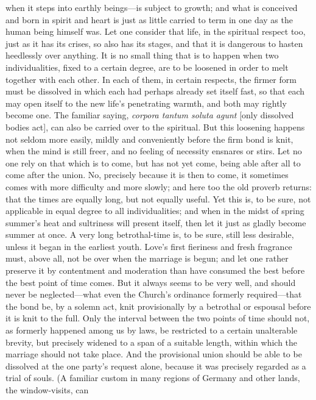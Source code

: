 \documentclass[12pt,a4paper]{book}
\begin{document}
when it steps into earthly beings---is subject to growth; and what is
conceived and born in spirit and heart is just as little carried to term in
one day as the human being himself was. Let one consider that life, in the
spiritual respect too, just as it has its crises, so also has its stages,
and that it is dangerous to hasten heedlessly over anything. It is no small
thing that is to happen when two individualities, fixed to a certain
degree, are to be loosened in order to melt together with each other. In
each of them, in certain respects, the firmer form must be dissolved in
which each had perhaps already set itself fast, so that each may open
itself to the new life's penetrating warmth, and both may rightly become
one. The familiar saying, \textit{corpora tantum soluta agunt} [only
dissolved bodies act], can also be carried over to the spiritual. But this
loosening happens not seldom more easily, mildly and conveniently before
the firm bond is knit, when the mind is still freer, and no feeling of
necessity ensnares or stirs. Let no one rely on that which is to come, but
has not yet come, being able after all to come after the union. No,
precisely because it is then to come, it sometimes comes with more
difficulty and more slowly; and here too the old proverb returns: that the
times are equally long, but not equally useful. Yet this is, to be sure,
not applicable in equal degree to all individualities; and when in the
midst of spring summer's heat and sultriness will present itself, then let
it just as gladly become summer at once. A very long betrothal-time is, to
be sure, still less desirable, unless it began in the earliest youth.
Love's first fieriness and fresh fragrance must, above all, not be over
when the marriage is begun; and let one rather preserve it by contentment
and moderation than have consumed the best before the best point of time
comes. But it always seems to be very well, and should never be
neglected---what even the Church's ordinance formerly required---that the
bond be, by a solemn act, knit provisionally by a betrothal or espousal
before it is knit to the full. Only the interval between the two points of
time should not, as formerly happened among us by laws, be restricted to a
certain unalterable brevity, but precisely widened to a span of a suitable
length, within which the marriage should not take place. And the
provisional union should be able to be dissolved at the one party's request
alone, because it was precisely regarded as a trial of souls. (A familiar
custom in many regions of Germany and other lands, the window-visits, can
\end{document}
